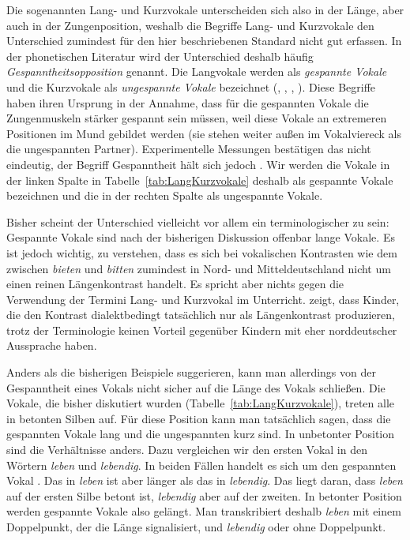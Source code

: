 Die sogenannten Lang- und Kurzvokale unterscheiden sich also in der Länge, aber auch in der Zungenposition, weshalb die Begriffe Lang- und Kurzvokale den Unterschied zumindest für den hier beschriebenen Standard nicht gut erfassen. In der phonetischen Literatur wird der Unterschied deshalb häufig \textit{Gespanntheitsopposition} genannt. Die Langvokale werden als \textit{gespannte Vokale} und die Kurzvokale als \textit{ungespannte Vokale} bezeichnet (\zB \cite[39--47]{Becker1998}, \cite[227]{Pompino-Marschall2020}, \cite[26]{FuhrhopPeters2013}, \cite[27]{Hall2000}). Diese Begriffe haben ihren Ursprung in der Annahme, dass für die gespannten Vokale die Zungenmuskeln stärker gespannt sein müssen, weil diese Vokale an extremeren Positionen im Mund gebildet werden (sie stehen weiter außen im Vokalviereck als die ungespannten Partner). Experimentelle Messungen bestätigen das nicht eindeutig, der Begriff Gespanntheit hält sich jedoch \citep[43--44]{Becker1998}. Wir werden die Vokale in der linken Spalte in Tabelle~\ref{tab:LangKurzvokale} deshalb als gespannte Vokale bezeichnen und die in der rechten Spalte als ungespannte Vokale.

Bisher scheint der Unterschied vielleicht vor allem ein terminologischer zu sein: Gespannte Vokale sind nach der bisherigen Diskussion offenbar lange Vokale. Es ist jedoch wichtig, zu verstehen, dass es sich bei vokalischen Kontrasten wie dem zwischen \textit{bieten} und \textit{bitten} zumindest in Nord- und Mitteldeutschland nicht um einen reinen Längenkontrast handelt. Es spricht aber nichts gegen die Verwendung der Termini Lang- und Kurzvokal im Unterricht. \citet[204--207]{Spiekermann2002} zeigt, dass Kinder, die den Kontrast dialektbedingt tatsächlich nur als Längenkontrast produzieren, trotz der Terminologie keinen Vorteil gegenüber Kindern mit eher norddeutscher Aussprache haben.

Anders als die bisherigen Beispiele suggerieren, kann man allerdings von der Gespanntheit eines Vokals nicht sicher auf die Länge des Vokals schließen. Die Vokale, die bisher diskutiert wurden (Tabelle~\ref{tab:LangKurzvokale}), treten alle in betonten Silben auf. Für diese Position kann man tatsächlich sagen, dass die gespannten Vokale lang und die ungespannten kurz sind. In unbetonter Position sind die Verhältnisse anders. Dazu vergleichen wir den ersten Vokal in den Wörtern \textit{leben} und \textit{lebendig}. In beiden Fällen handelt es sich um den gespannten Vokal \textipa{[e]}. Das \textipa{[e]} in \textit{leben} ist aber länger als das \textipa{[e]} in \textit{lebendig}. Das liegt daran, dass \textit{leben} auf der ersten Silbe betont ist, \textit{lebendig} aber auf der zweiten. In betonter Position werden gespannte Vokale also gelängt. Man transkribiert deshalb \textit{leben} \textipa{[\textprimstress le:.b@n]} mit einem Doppelpunkt, der die Länge signalisiert, und \textit{lebendig}  oder  ohne Doppelpunkt.


